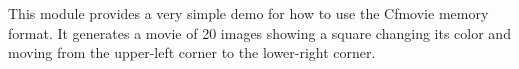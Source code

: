 This module provides a very simple demo for how to use the Cfmovie memory
format.
It generates a movie of 20 images showing a square changing its
color and moving from the upper-left corner to the lower-right corner.
